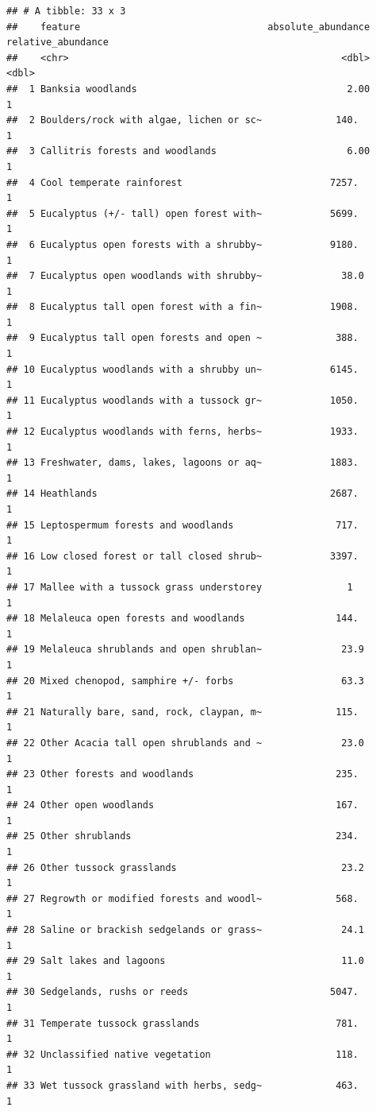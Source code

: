 \documentclass[
  12pt,
]{book}
\begin{document}
\begin{verbatim}
## # A tibble: 33 x 3
##    feature                                 absolute_abundance relative_abundance
##    <chr>                                                <dbl>              <dbl>
##  1 Banksia woodlands                                     2.00                  1
##  2 Boulders/rock with algae, lichen or sc~             140.                    1
##  3 Callitris forests and woodlands                       6.00                  1
##  4 Cool temperate rainforest                          7257.                    1
##  5 Eucalyptus (+/- tall) open forest with~            5699.                    1
##  6 Eucalyptus open forests with a shrubby~            9180.                    1
##  7 Eucalyptus open woodlands with shrubby~              38.0                   1
##  8 Eucalyptus tall open forest with a fin~            1908.                    1
##  9 Eucalyptus tall open forests and open ~             388.                    1
## 10 Eucalyptus woodlands with a shrubby un~            6145.                    1
## 11 Eucalyptus woodlands with a tussock gr~            1050.                    1
## 12 Eucalyptus woodlands with ferns, herbs~            1933.                    1
## 13 Freshwater, dams, lakes, lagoons or aq~            1883.                    1
## 14 Heathlands                                         2687.                    1
## 15 Leptospermum forests and woodlands                  717.                    1
## 16 Low closed forest or tall closed shrub~            3397.                    1
## 17 Mallee with a tussock grass understorey               1                     1
## 18 Melaleuca open forests and woodlands                144.                    1
## 19 Melaleuca shrublands and open shrublan~              23.9                   1
## 20 Mixed chenopod, samphire +/- forbs                   63.3                   1
## 21 Naturally bare, sand, rock, claypan, m~             115.                    1
## 22 Other Acacia tall open shrublands and ~              23.0                   1
## 23 Other forests and woodlands                         235.                    1
## 24 Other open woodlands                                167.                    1
## 25 Other shrublands                                    234.                    1
## 26 Other tussock grasslands                             23.2                   1
## 27 Regrowth or modified forests and woodl~             568.                    1
## 28 Saline or brackish sedgelands or grass~              24.1                   1
## 29 Salt lakes and lagoons                               11.0                   1
## 30 Sedgelands, rushs or reeds                         5047.                    1
## 31 Temperate tussock grasslands                        781.                    1
## 32 Unclassified native vegetation                      118.                    1
## 33 Wet tussock grassland with herbs, sedg~             463.                    1
\end{verbatim}
\end{document}
